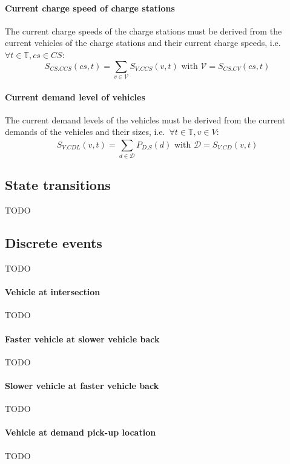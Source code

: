 \documentclass{article}
\begin{document}
    \paragraph{Current charge speed of charge stations}
    The current charge speeds of the charge stations must be derived from the current vehicles of the charge stations and their current charge speeds, i.e.\ $\forall t \in \mathbb{T}, cs \in CS:$
    \[
        S_{CS.CCS}(cs,t)=\sum_{v \in \mathcal{V}}S_{V.CCS}(v,t) \textrm{ with } \mathcal{V}=S_{CS.CV}(cs,t)
    \]

    \paragraph{Current demand level of vehicles}
    The current demand levels of the vehicles must be derived from the current demands of the vehicles and their sizes, i.e.\ $\forall t \in \mathbb{T}, v \in V:$
    \[
        S_{V.CDL}(v,t)=\sum_{d \in \mathcal{D}}^{}P_{D.S}(d) \textrm{ with } \mathcal{D}=S_{V.CD}(v,t)
    \]

    \subsection{State transitions}
    \label{sec:transitions}
    TODO

    \subsection{Discrete events}
    \label{sec:events}
    TODO

    \paragraph{Vehicle at intersection}
    TODO

    \paragraph{Faster vehicle at slower vehicle back}
    TODO

    \paragraph{Slower vehicle at faster vehicle back}
    TODO

    \paragraph{Vehicle at demand pick-up location}
    TODO
\end{document}
